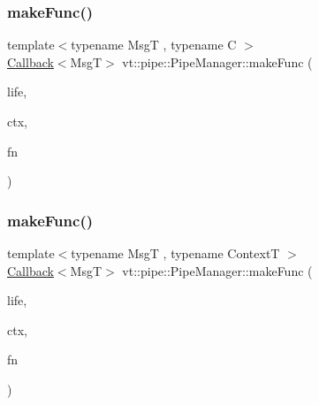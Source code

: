 \mbox{\label{structvt_1_1pipe_1_1_pipe_manager_aeade0c95a974823a05ba925167c82889}} 
\subsubsection{\texorpdfstring{make\+Func()}{makeFunc()}\hspace{0.1cm}{\footnotesize\ttfamily [2/6]}}
{\footnotesize\ttfamily template$<$typename MsgT , typename C $>$ \\
\hyperlink{namespacevt_a57b238783d05de96bc2c4027f7073b7f}{Callback}$<$MsgT$>$ vt\+::pipe\+::\+Pipe\+Manager\+::make\+Func (\begin{DoxyParamCaption}\item[{\hyperlink{namespacevt_1_1pipe_acb42b284378c0fdac1d7c6335dc26f58}{Lifetime\+Enum}}]{life,  }\item[{C $\ast$}]{ctx,  }\item[{\hyperlink{structvt_1_1pipe_1_1_pipe_manager_base_a73fdf82ece0411b3dc644c99b763f7a9}{Func\+Msg\+Ctx\+Type}$<$ MsgT, C $>$}]{fn }\end{DoxyParamCaption})}

\mbox{\label{structvt_1_1pipe_1_1_pipe_manager_a9ceec59c887d0fa1498b931c788962f6}} 
\subsubsection{\texorpdfstring{make\+Func()}{makeFunc()}\hspace{0.1cm}{\footnotesize\ttfamily [3/6]}}
{\footnotesize\ttfamily template$<$typename MsgT , typename ContextT $>$ \\
\hyperlink{namespacevt_a57b238783d05de96bc2c4027f7073b7f}{Callback}$<$MsgT$>$ vt\+::pipe\+::\+Pipe\+Manager\+::make\+Func (\begin{DoxyParamCaption}\item[{\hyperlink{namespacevt_1_1pipe_acb42b284378c0fdac1d7c6335dc26f58}{Lifetime\+Enum}}]{life,  }\item[{ContextT $\ast$}]{ctx,  }\item[{\hyperlink{structvt_1_1pipe_1_1_pipe_manager_base_a73fdf82ece0411b3dc644c99b763f7a9}{Func\+Msg\+Ctx\+Type}$<$ MsgT, ContextT $>$}]{fn }\end{DoxyParamCaption})}



